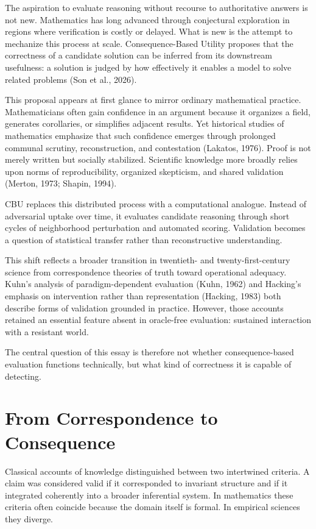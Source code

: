 \documentclass[11pt]{article}
\begin{document}
The aspiration to evaluate reasoning without recourse to authoritative answers is not new. Mathematics has long advanced through conjectural exploration in regions where verification is costly or delayed. What is new is the attempt to mechanize this process at scale. Consequence-Based Utility proposes that the correctness of a candidate solution can be inferred from its downstream usefulness: a solution is judged by how effectively it enables a model to solve related problems (Son et al., 2026).

This proposal appears at first glance to mirror ordinary mathematical practice. Mathematicians often gain confidence in an argument because it organizes a field, generates corollaries, or simplifies adjacent results. Yet historical studies of mathematics emphasize that such confidence emerges through prolonged communal scrutiny, reconstruction, and contestation (Lakatos, 1976). Proof is not merely written but socially stabilized. Scientific knowledge more broadly relies upon norms of reproducibility, organized skepticism, and shared validation (Merton, 1973; Shapin, 1994).

CBU replaces this distributed process with a computational analogue. Instead of adversarial uptake over time, it evaluates candidate reasoning through short cycles of neighborhood perturbation and automated scoring. Validation becomes a question of statistical transfer rather than reconstructive understanding.

This shift reflects a broader transition in twentieth- and twenty-first-century science from correspondence theories of truth toward operational adequacy. Kuhn's analysis of paradigm-dependent evaluation (Kuhn, 1962) and Hacking's emphasis on intervention rather than representation (Hacking, 1983) both describe forms of validation grounded in practice. However, those accounts retained an essential feature absent in oracle-free evaluation: sustained interaction with a resistant world.

The central question of this essay is therefore not whether consequence-based evaluation functions technically, but what kind of correctness it is capable of detecting.

\section{From Correspondence to Consequence}

Classical accounts of knowledge distinguished between two intertwined criteria. A claim was considered valid if it corresponded to invariant structure and if it integrated coherently into a broader inferential system. In mathematics these criteria often coincide because the domain itself is formal. In empirical sciences they diverge.
\end{document}
